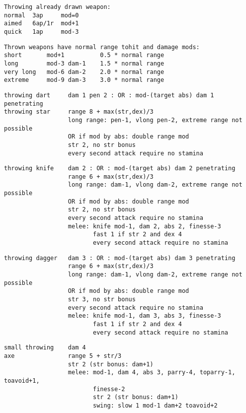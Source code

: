 \begin{samepage}
\begin{verbatim}
Throwing already drawn weapon:
normal  3ap     mod=0
aimed   6ap/1r  mod+1
quick   1ap     mod-3
\end{verbatim} \blocklistgap \begin{verbatim}
Thrown weapons have normal range tohit and damage mods:
short       mod+1          0.5 * normal range
long        mod-3 dam-1    1.5 * normal range
very long   mod-6 dam-2    2.0 * normal range
extreme     mod-9 dam-3    3.0 * normal range
\end{verbatim} \blocklistgap \begin{verbatim}
throwing dart     dam 1 pen 2 : OR : mod-(target abs) dam 1 penetrating
throwing star     range 8 + max(str,dex)/3
                  long range: pen-1, vlong pen-2, extreme range not possible
                  OR if mod by abs: double range mod
                  str 2, no str bonus
                  every second attack require no stamina
\end{verbatim} \blocklistgap \begin{verbatim}
throwing knife    dam 2 : OR : mod-(target abs) dam 2 penetrating
                  range 6 + max(str,dex)/3
                  long range: dam-1, vlong dam-2, extreme range not possible
                  OR if mod by abs: double range mod
                  str 2, no str bonus
                  every second attack require no stamina
                  melee: knife mod-1, dam 2, abs 2, finesse-3
                         fast 1 if str 2 and dex 4
                         every second attack require no stamina
\end{verbatim} \blocklistgap \begin{verbatim}
throwing dagger   dam 3 : OR : mod-(target abs) dam 3 penetrating
                  range 6 + max(str,dex)/3
                  long range: dam-1, vlong dam-2, extreme range not possible
                  OR if mod by abs: double range mod
                  str 3, no str bonus
                  every second attack require no stamina
                  melee: knife mod-1, dam 3, abs 3, finesse-3
                         fast 1 if str 2 and dex 4
                         every second attack require no stamina
\end{verbatim} \blocklistgap \begin{verbatim}
small throwing    dam 4
axe               range 5 + str/3
                  str 2 (str bonus: dam+1)
                  melee: mod-1, dam 4, abs 3, parry-4, toparry-1, toavoid+1,
                         finesse-2
                         str 2 (str bonus: dam+1)
                         swing: slow 1 mod-1 dam+2 toavoid+2

\end{verbatim}
\end{samepage}
